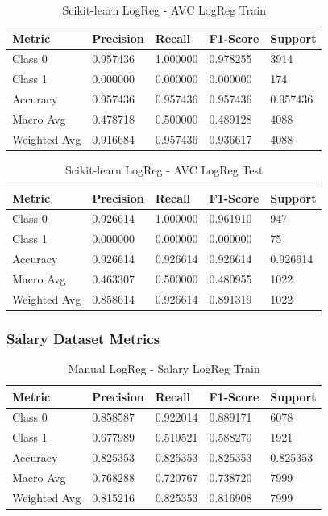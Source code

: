\documentclass[a4paper,12pt]{article}
\begin{document}
    \begin{table}[h!]
    \centering
    \caption{Scikit-learn LogReg - AVC LogReg Train}
    \begin{tabularx}{\textwidth}{|l|X|X|X|X|}
    \hline
    \textbf{Metric} & \textbf{Precision} & \textbf{Recall} & \textbf{F1-Score} & \textbf{Support} \\
    \hline
    Class 0 & 0.957436 & 1.000000 & 0.978255 & 3914 \\
    Class 1 & 0.000000 & 0.000000 & 0.000000 & 174 \\
    Accuracy & 0.957436 & 0.957436 & 0.957436 & 0.957436 \\
    Macro Avg & 0.478718 & 0.500000 & 0.489128 & 4088 \\
    Weighted Avg & 0.916684 & 0.957436 & 0.936617 & 4088 \\
    \hline
    \end{tabularx}
    \end{table}
    
    \begin{table}[h!]
    \centering
    \caption{Scikit-learn LogReg - AVC LogReg Test}
    \begin{tabularx}{\textwidth}{|l|X|X|X|X|}
    \hline
    \textbf{Metric} & \textbf{Precision} & \textbf{Recall} & \textbf{F1-Score} & \textbf{Support} \\
    \hline
    Class 0 & 0.926614 & 1.000000 & 0.961910 & 947 \\
    Class 1 & 0.000000 & 0.000000 & 0.000000 & 75 \\
    Accuracy & 0.926614 & 0.926614 & 0.926614 & 0.926614 \\
    Macro Avg & 0.463307 & 0.500000 & 0.480955 & 1022 \\
    Weighted Avg & 0.858614 & 0.926614 & 0.891319 & 1022 \\
    \hline
    \end{tabularx}
    \end{table}
    
    \newpage
\subsubsection{Salary Dataset Metrics}
    
    \begin{table}[h!]
    \centering
    \caption{Manual LogReg - Salary LogReg Train}
    \begin{tabularx}{\textwidth}{|l|X|X|X|X|}
    \hline
    \textbf{Metric} & \textbf{Precision} & \textbf{Recall} & \textbf{F1-Score} & \textbf{Support} \\
    \hline
    Class 0 & 0.858587 & 0.922014 & 0.889171 & 6078 \\
    Class 1 & 0.677989 & 0.519521 & 0.588270 & 1921 \\
    Accuracy & 0.825353 & 0.825353 & 0.825353 & 0.825353 \\
    Macro Avg & 0.768288 & 0.720767 & 0.738720 & 7999 \\
    Weighted Avg & 0.815216 & 0.825353 & 0.816908 & 7999 \\
    \hline
    \end{tabularx}
    \end{table}
    
\end{document}
